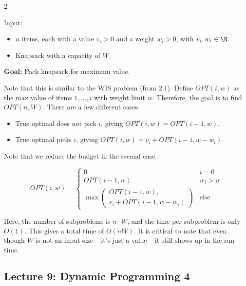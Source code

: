 \begin{multicols}{2}
\begin{leftbar}
    Input:
    \begin{itemize}
        \item $n$ items, each with a value $v_i > 0$ and a weight $w_i > 0$, with $v_i, w_i \in \N$.
        \item Knapsack with a capacity of $W$. 
    \end{itemize}
    \textbf{Goal:} Pack knapsack for maximum value. 
\end{leftbar}
Note that this is similar to the WIS problem (from 2.1). Define $OPT(i,w)$ as the max value of items $1, \ldots, i$ with weight limit $w$. Therefore, the goal is to find $OPT(n, W)$. There are a few different cases. 
\begin{itemize}
    \item True optimal does not pick $i$, giving $OPT(i, w) = OPT(i - 1, w)$. 
    \item True optimal picks $i$, giving $OPT(i, w) = v_i + OPT(i -1, w - w_i)$.  
\end{itemize}
Note that we reduce the budget in the second case. 

$$
OPT(i, w) = 
\begin{cases}
    0 & i = 0 \\
    OPT(i - 1, w) & w_i > w \\
    \max\left(\substack{OPT(i - 1, w), \\ v_i + OPT(i - 1, w - w_i)}\right) & \textrm{else}
\end{cases}
$$
\begin{analysis}
    Here, the number of subproblems is $n \cdot W$, and the time per subproblem is only $O(1)$. This gives a total time of $O(nW)$. It is critical to note that even though $W$ is not an input size -- it's just a value -- it still shows up in the run time. 
\end{analysis}
\end{multicols}

\newpage
\subsection{Lecture 9: Dynamic Programming 4}

